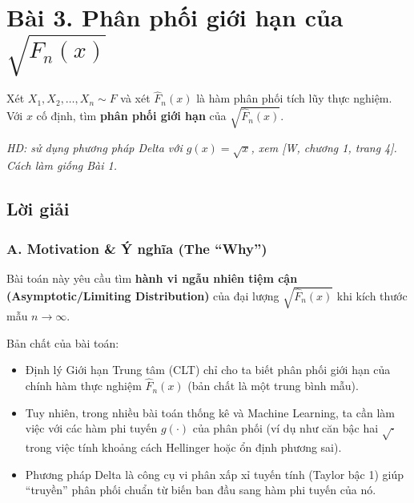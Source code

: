 \documentclass[12pt,a4paper]{article}
\begin{document}
\section{\texorpdfstring{Bài 3. Phân phối giới hạn của \(\sqrt{\widehat{F}_n(x)}\)}{Bài 3. Phân phối giới hạn của \textbackslash sqrt\{\textbackslash widehat\{F\}\_n(x)\}}}\label{buxe0i-3.-phuxe2n-phux1ed1i-giux1edbi-hux1ea1n-cux1ee7a-sqrtwidehatf_nx}

\begin{debai}

Xét \(X_1, X_2, \dots, X_n \sim F\) và xét \(\widehat{F}_n(x)\) là hàm phân phối tích lũy thực nghiệm. Với \(x\) cố định, tìm \textbf{phân phối giới hạn} của \(\sqrt{\widehat{F}_n(x)}\).

\emph{HD: sử dụng phương pháp Delta với \(g(x) = \sqrt{x}\), xem {[}W, chương 1, trang 4{]}. Cách làm giống Bài 1.}

\end{debai}
\subsection*{Lời giải}

\subsubsection{A. Motivation \& Ý nghĩa (The ``Why'')}\label{a.-motivation-uxfd-nghux129a-the-why-2}

Bài toán này yêu cầu tìm \textbf{hành vi ngẫu nhiên tiệm cận (Asymptotic/Limiting Distribution)} của đại lượng \(\sqrt{\widehat{F}_n(x)}\) khi kích thước mẫu \(n \to \infty\).

Bản chất của bài toán:

\begin{itemize}

\item
  Định lý Giới hạn Trung tâm (CLT) chỉ cho ta biết phân phối giới hạn của chính hàm thực nghiệm \(\widehat{F}_n(x)\) (bản chất là một trung bình mẫu).
\item
  Tuy nhiên, trong nhiều bài toán thống kê và Machine Learning, ta cần làm việc với các hàm phi tuyến \(g(\cdot)\) của phân phối (ví dụ như căn bậc hai \(\sqrt{\cdot}\) trong việc tính khoảng cách Hellinger hoặc ổn định phương sai).
\item
  Phương pháp Delta là công cụ vi phân xấp xỉ tuyến tính (Taylor bậc 1) giúp ``truyền'' phân phối chuẩn từ biến ban đầu sang hàm phi tuyến của nó.
\end{itemize}
\end{document}
